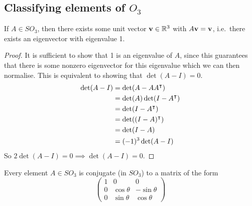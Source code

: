 \subsection{Classifying elements of \(O_3\)}
\begin{theorem}
	If \(A \in SO_3\), then there exists some unit vector \(\vb v \in \mathbb R^3\) with \(A\vb v = \vb v\), i.e.\ there exists an eigenvector with eigenvalue 1.
\end{theorem}
\begin{proof}
	It is sufficient to show that 1 is an eigenvalue of \(A\), since this guarantees that there is some nonzero eigenvector for this eigenvalue which we can then normalise.
	This is equivalent to showing that \(\det (A - I) = 0\).
	\begin{align*}
		\det(A - I) & = \det(A - AA^\intercal)       \\
		            & = \det(A)\det(I - A^\intercal) \\
		            & = \det(I - A^\intercal)        \\
		            & = \det((I - A)^\intercal)      \\
		            & = \det(I - A)                   \\
		            & = (-1)^3\det(A - I)
	\end{align*}
	So \(2\det(A - I) = 0 \implies \det(A - I) = 0\).
\end{proof}
\begin{corollary}
	Every element \(A \in SO_3\) is conjugate (in \(SO_3\)) to a matrix of the form
	\[
		\begin{pmatrix}
			1 & 0           & 0            \\
			0 & \cos \theta & -\sin \theta \\
			0 & \sin \theta & \cos \theta
		\end{pmatrix}
	\]
\end{corollary}
